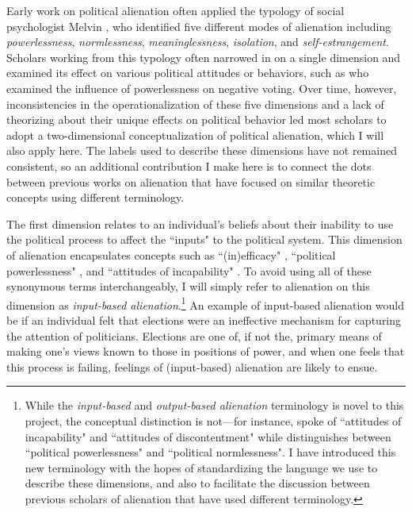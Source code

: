 \documentclass[12pt]{article}
\begin{document}
Early work on political alienation often applied the typology of social psychologist Melvin \textcite{seeman1959}, who identified five different modes of alienation including \textit{powerlessness}, \textit{normlessness}, \textit{meaninglessness}, \textit{isolation}, and \textit{self-estrangement}. Scholars working from this typology often narrowed in on a single dimension and examined its effect on various political attitudes or behaviors, such as \textcite{horton1962powerlessness} who examined the influence of powerlessness on negative voting. Over time, however, inconsistencies in the operationalization of these five dimensions and a lack of theorizing about their unique effects on political behavior led most scholars to adopt a two-dimensional conceptualization of political alienation, which I will also apply here. The labels used to describe these dimensions have not remained consistent, so an additional contribution I make here is to connect the dots between previous works on alienation that have focused on similar theoretic concepts using different terminology. 

The first dimension relates to an individual's beliefs about their inability to use the political process to affect the ``inputs" \parencite{almond1963civic,easton1965systems} to the political system. This dimension of alienation encapsulates concepts such as ``(in)efficacy" \parencite{campbell1960american,aberbach1969alienation}, ``political powerlessness" \parencite{finifter1970dimensions}, and ``attitudes of incapability" \parencite{olsen1969}. To avoid using all of these synonymous terms interchangeably, I will simply refer to alienation on this dimension as \textit{input-based alienation}.\footnote{While the \textit{input-based} and \textit{output-based alienation} terminology is novel to this project, the conceptual distinction is not---for instance, \textcite{olsen1969} spoke of ``attitudes of incapability" and ``attitudes of discontentment" while \textcite{finifter1970dimensions} distinguishes between ``political powerlessness" and ``political normlessness". I have introduced this new terminology with the hopes of standardizing the language we use to describe these dimensions, and also to facilitate the discussion between previous scholars of alienation that have used different terminology.} An example of input-based alienation would be if an individual felt that elections were an ineffective mechanism for capturing the attention of politicians. Elections are one of, if not the, primary means of making one's views known to those in positions of power, and when one feels that this process is failing, feelings of (input-based) alienation are likely to ensue. 
\end{document}
